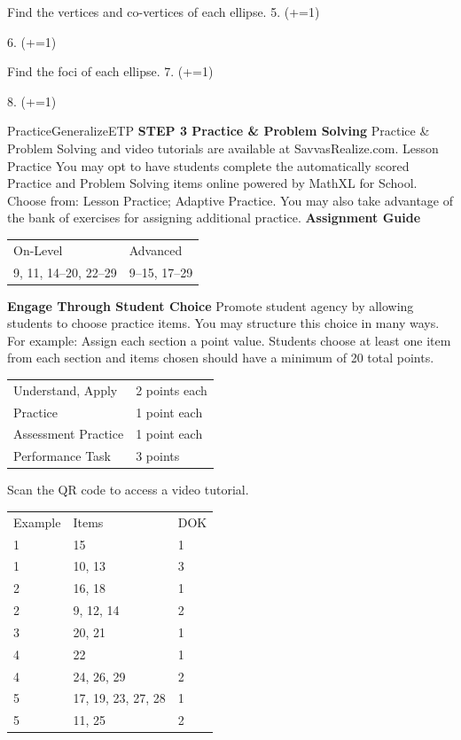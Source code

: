 \documentclass{article}
\newenvironment{item-analysis}{}{}      %
\newenvironment{concept-summary}{}{}    %
\newenvironment{te-addendum}[2]{}{}     %
\newcommand{\answer}[1]{}               %
\begin{document}
\begin{concept-summary}
Find the vertices and co-vertices of each ellipse.
5. (+=1)
\answer{vertices: ((0,8)), ((0,-8)); co-vertices: ((7,0)), ((-7,0))}
6. (+=1)
\answer{vertices: ((-3,-5)), ((5,-5)); co-vertices: ((1,-3)), ((1,-7))}
Find the foci of each ellipse.
7. (+=1)
\answer{((0,\sqrt{6})), ((0,-\sqrt{6})); approximately ((0,2.4)), ((0,-2.4))}
8. (+=1)
\answer{((-5+2\sqrt{3},9)), ((-5-2\sqrt{3},9)); approximately ((-1.5,9)), ((-8.5,9))}
\end{concept-summary}
\begin{te-addendum}{Practice}{GeneralizeETP}
\textbf{STEP 3 Practice & Problem Solving}
Practice & Problem Solving and video tutorials are available at SavvasRealize.com.
Lesson Practice You may opt to have students complete the automatically scored Practice and Problem Solving items online powered by MathXL for School.
Choose from: Lesson Practice; Adaptive Practice.
You may also take advantage of the bank of exercises for assigning additional practice.
\textbf{Assignment Guide}
\begin{tabular}{ll}
On-Level & Advanced \\
9, 11, 14--20, 22--29 & 9--15, 17--29 \\
\end{tabular}
\textbf{Engage Through Student Choice}
Promote student agency by allowing students to choose practice items. You may structure this choice in many ways.
For example:
Assign each section a point value. Students choose at least one item from each section and items chosen should have a minimum of 20 total points.
\begin{tabular}{ll}
Understand, Apply & 2 points each \\
Practice & 1 point each \\
Assessment Practice & 1 point each \\
Performance Task & 3 points \\
\end{tabular}
Scan the QR code to access a video tutorial.
\end{te-addendum}
\begin{item-analysis}
\begin{tabular}{lll}
Example & Items & DOK \\
1 & 15 & 1 \\
1 & 10, 13 & 3 \\
2 & 16, 18 & 1 \\
2 & 9, 12, 14 & 2 \\
3 & 20, 21 & 1 \\
4 & 22 & 1 \\
4 & 24, 26, 29 & 2 \\
5 & 17, 19, 23, 27, 28 & 1 \\
5 & 11, 25 & 2 \\
\end{tabular}
\end{item-analysis}
\end{document}

